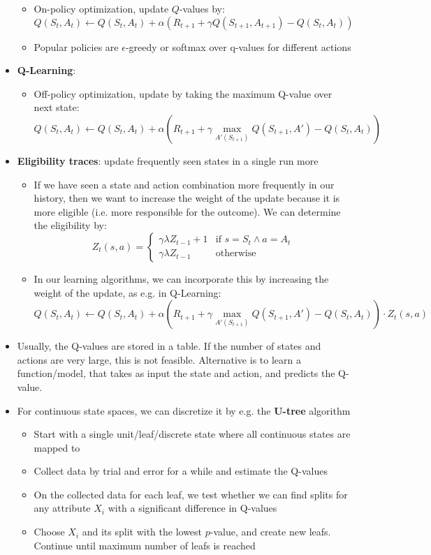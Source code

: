 \begin{itemize}
\begin{itemize}
		\item On-policy optimization, update $Q$-values by:
		$$Q(S_t, A_t) \leftarrow Q(S_t, A_t) + \alpha(R_{t+1} + \gamma Q(S_{t+1}, A_{t+1}) - Q(S_t, A_t))$$
		\item Popular policies are $\epsilon$-greedy or softmax over q-values for different actions
	\end{itemize}
	\item \textbf{Q-Learning}:
	\begin{itemize}
		\item Off-policy optimization, update by taking the maximum Q-value over next state:
		$$Q(S_t, A_t) \leftarrow Q(S_t, A_t) + \alpha(R_{t+1} + \gamma \max\limits_{A'(S_{t+1})} Q(S_{t+1}, A') - Q(S_t, A_t))$$
	\end{itemize}
	\item \textbf{Eligibility traces}: update frequently seen states in a single run more
	\begin{itemize}
		\item If we have seen a state and action combination more frequently in our history, then we want to increase the weight of the update because it is more eligible (i.e. more responsible for the outcome). We can determine the eligibility by:
		$$Z_t(s, a) = \begin{cases}
		\gamma \lambda Z_{t-1} + 1 & \text{if } s=S_t\wedge a=A_t\\
		 \gamma \lambda Z_{t-1} & \text{otherwise}
		\end{cases}$$
		\item In our learning algorithms, we can incorporate this by increasing the weight of the update, as e.g. in Q-Learning:
		$$Q(S_t, A_t) \leftarrow Q(S_t, A_t) + \alpha(R_{t+1} + \gamma \max\limits_{A'(S_{t+1})} Q(S_{t+1}, A') - Q(S_t, A_t))\cdot Z_t(s,a)$$
	\end{itemize}
	\item Usually, the Q-values are stored in a table. If the number of states and actions are very large, this is not feasible. Alternative is to learn a function/model, that takes as input the state and action, and predicts the Q-value.
	\item For continuous state spaces, we can discretize it by e.g. the \textbf{U-tree} algorithm
	\begin{itemize}
		\item Start with a single unit/leaf/discrete state where all continuous states are mapped to 
		\item Collect data by trial and error for a while and estimate the Q-values
		\item On the collected data for each leaf, we test whether we can find splits for any attribute $X_i$ with a significant difference in Q-values
		\item Choose $X_i$ and its split with the lowest $p$-value, and create new leafs. Continue until maximum number of leafs is reached
	\end{itemize}
\end{itemize}